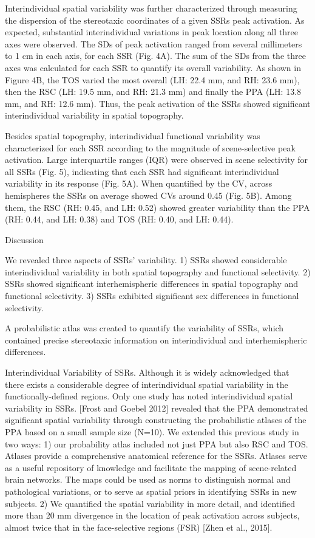 %
Interindividual spatial variability was further characterized through measuring
the dispersion of the stereotaxic coordinates of a given SSRs peak activation.
%
As expected, substantial interindividual variations in peak location along all
three axes were observed.
%
The SDs of peak activation ranged from several millimeters to 1 cm in each axis,
for each SSR (Fig. 4A).
%
The sum of the SDs from the three axes was calculated for each SSR to quantify
its overall variability.
%
As shown in Figure 4B, the TOS varied the most overall (LH: 22.4 mm, and RH:
23.6 mm), then the RSC (LH: 19.5 mm, and RH: 21.3 mm) and finally the PPA (LH:
13.8 mm, and RH: 12.6 mm).
%
Thus, the peak activation of the SSRs showed significant interindividual
variability in spatial topography.

%
Besides spatial topography, interindividual functional variability was
characterized for each SSR according to the magnitude of scene-selective peak
activation.
%
Large interquartile ranges (IQR) were observed in scene selectivity for all SSRs
(Fig. 5), indicating that each SSR had significant interindividual variability
in its response (Fig. 5A).
%
When quantified by the CV, across hemispheres the SSRs on average showed CVs
around 0.45 (Fig. 5B).
%
Among them, the RSC (RH: 0.45, and LH: 0.52) showed greater variability than the
PPA (RH: 0.44, and LH: 0.38) and TOS (RH: 0.40, and LH: 0.44).

Discussion

We revealed three aspects of SSRs' variability.
%
1) SSRs showed considerable interindividual variability in both spatial
topography and functional selectivity.
%
2) SSRs showed significant interhemispheric differences in spatial topography
and functional selectivity.
%
3) SSRs exhibited significant sex differences in functional selectivity.

%
A probabilistic atlas was created to quantify the variability of SSRs, which
contained precise stereotaxic information on interindividual and
interhemispheric differences.

Interindividual Variability of SSRs.
%
Although it is widely acknowledged that there exists a considerable degree of
interindividual spatial variability in the functionally-defined regions.
%
Only one study has noted interindividual spatial variability in SSRs.
%
[Frost and Goebel 2012] revealed that the PPA demonstrated significant spatial
variability through constructing the probabilistic atlases of the PPA based on a
small sample size (N=10).
%
We extended this previous study in two ways:
%
1) our probability atlas included not just PPA but also RSC and TOS.
%
Atlases provide a comprehensive anatomical reference for the SSRs.
%
Atlases serve as a useful repository of knowledge and facilitate the mapping of
scene-related brain networks.
%
The maps could be used as norms to distinguish normal and pathological
variations, or to serve as spatial priors in identifying SSRs in new subjects.
%
2) We quantified the spatial variability in more detail, and identified
more than 20 mm divergence in the location of peak activation across subjects,
almost twice that in the face-selective regions (FSR) [Zhen et al., 2015].

